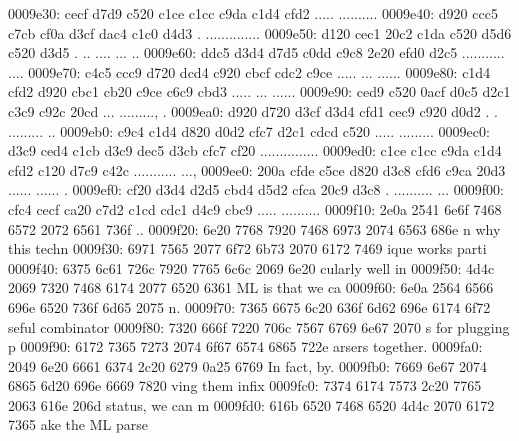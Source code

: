 \begin{bo
00010e0: 7865 647d 5c62 6567 696e 7b76 6572 6261  xed}
\begin{verba
00010f0: 7469 6d7d 0a20 2023 7479 7065 2074 6572  tim}
\begin{
0001c40: 7665 7262 6174 696d 7d0a 2020 236c 6574  verbatim}
\begin{boxe
00027a0: 647d 5c62 6567 696e 7b76 6572 6261 7469  d}
\begin{verbati
00027b0: 6d7d 0a20 2023 6c65 7420 696e 6669 7865  m}
\begin{v
0002c60: 6572 6261 7469 6d7d 0a20 2023 6c65 7420  erbatim}
\begin{
0002dc0: 7665 7262 6174 696d 7d0a 2020 236c 6574  verbatim}
\begin{boxed
0002f30: 7d5c 6265 6769 6e7b 7665 7262 6174 696d  }
\begin{verbatim
0002f40: 7d0a 2020 236c 6574 2068 6428 683a 3a74  }
\begin{v
0003e60: 6572 6261 7469 6d7d 0a20 2023 236f 7065  erbatim}
\begin{boxed
00042b0: 7d5c 6265 6769 6e7b 7665 7262 6174 696d  }
\begin{verbatim
00042c0: 7d0a 2020 2328 782c 7429 3b3b 0a20 202d  }
0009e30: cecf d7d9 c520 c1ce c1cc c9da c1d4 cfd2  ..... ..........
0009e40: d920 ccc5 c7cb cf0a d3cf dac4 c1c0 d4d3  . ..............
0009e50: d120 cec1 20c2 c1da c520 d5d6 c520 d3d5  . .. .... ... ..
0009e60: ddc5 d3d4 d7d5 c0dd c9c8 2e20 efd0 d2c5  ........... ....
0009e70: c4c5 ccc9 d720 dcd4 c920 cbcf cdc2 c9ce  ..... ... ......
0009e80: c1d4 cfd2 d920 cbc1 cb20 c9ce c6c9 cbd3  ..... ... ......
0009e90: ced9 c520 0acf d0c5 d2c1 c3c9 c92c 20cd  ... ........., .
0009ea0: d920 d720 d3cf d3d4 cfd1 cec9 c920 d0d2  . . ......... ..
0009eb0: c9c4 c1d4 d820 d0d2 cfc7 d2c1 cdcd c520  ..... ......... 
0009ec0: d3c9 ced4 c1cb d3c9 dec5 d3cb cfc7 cf20  ............... 
0009ed0: c1ce c1cc c9da c1d4 cfd2 c120 d7c9 c42c  ........... ...,
0009ee0: 200a cfde c5ce d820 d3c8 cfd6 c9ca 20d3   ...... ...... .
0009ef0: cf20 d3d4 d2d5 cbd4 d5d2 cfca 20c9 d3c8  . .......... ...
0009f00: cfc4 cecf ca20 c7d2 c1cd cdc1 d4c9 cbc9  ..... ..........
0009f10: 2e0a 2541 6e6f 7468 6572 2072 6561 736f  ..%
0009f20: 6e20 7768 7920 7468 6973 2074 6563 686e  n why this techn
0009f30: 6971 7565 2077 6f72 6b73 2070 6172 7469  ique works parti
0009f40: 6375 6c61 726c 7920 7765 6c6c 2069 6e20  cularly well in 
0009f50: 4d4c 2069 7320 7468 6174 2077 6520 6361  ML is that we ca
0009f60: 6e0a 2564 6566 696e 6520 736f 6d65 2075  n.%
0009f70: 7365 6675 6c20 636f 6d62 696e 6174 6f72  seful combinator
0009f80: 7320 666f 7220 706c 7567 6769 6e67 2070  s for plugging p
0009f90: 6172 7365 7273 2074 6f67 6574 6865 722e  arsers together.
0009fa0: 2049 6e20 6661 6374 2c20 6279 0a25 6769   In fact, by.%
0009fb0: 7669 6e67 2074 6865 6d20 696e 6669 7820  ving them infix 
0009fc0: 7374 6174 7573 2c20 7765 2063 616e 206d  status, we can m
0009fd0: 616b 6520 7468 6520 4d4c 2070 6172 7365  ake the ML parse

\end{verbatim
00042c0: 7d0a 2020 2328 782c 7429 3b3b 0a20 202d  }
\end{boxed
00042b0: 7d5c 6265 6769 6e7b 7665 7262 6174 696d  }
\end{v
0003e60: 6572 6261 7469 6d7d 0a20 2023 236f 7065  erbatim}
\end{verbatim
0002f40: 7d0a 2020 236c 6574 2068 6428 683a 3a74  }
\end{boxed
0002f30: 7d5c 6265 6769 6e7b 7665 7262 6174 696d  }
\end{
0002dc0: 7665 7262 6174 696d 7d0a 2020 236c 6574  verbatim}
\end{v
0002c60: 6572 6261 7469 6d7d 0a20 2023 6c65 7420  erbatim}
\end{verbati
00027b0: 6d7d 0a20 2023 6c65 7420 696e 6669 7865  m}
\end{boxe
00027a0: 647d 5c62 6567 696e 7b76 6572 6261 7469  d}
\end{
0001c40: 7665 7262 6174 696d 7d0a 2020 236c 6574  verbatim}
\end{verba
00010f0: 7469 6d7d 0a20 2023 7479 7065 2074 6572  tim}
\end{bo
00010e0: 7865 647d 5c62 6567 696e 7b76 6572 6261  xed}
